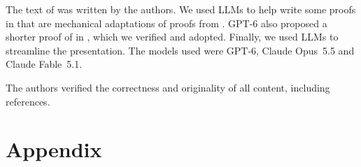 \documentclass[11pt]{article}
\begin{document}
The text of  was written by the authors.
We used LLMs to help write some proofs in  that are mechanical adaptations of proofs from \cite{locality-note}.
GPT-6 also proposed a shorter proof of  in , which we verified and adopted.
Finally, we used LLMs to streamline the presentation.
The models used were GPT-6, Claude Opus~5.5 and Claude Fable~5.1.

The authors verified the correctness and originality of all content, including references.


\printbibliography[heading=bibintoc]

\part*{Appendix}
\appendix



\end{document}
